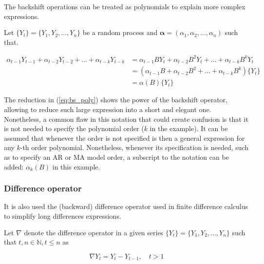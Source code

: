 \begin{property}
	
	The backshift operations can be treated as polynomials to explain more complex expressions.
	
	Let $\{Y_t\} = \{Y_1, Y_2, \ldots, Y_n\}$ be a random process and $\bm{\alpha} = (\alpha_1, \alpha_2, \ldots, \alpha_n)$ such that.

	
	\begin{equation}
		\label{eq:bs_poly}
\begin{split}
		\alpha_{t-1} Y_{t-1} + \alpha_{t-2} Y_{t-2} + \ldots + \alpha_{t-k} Y_{t-k} &=\alpha_{t-1} BY_{t} + \alpha_{t-2} B^2Y_{t} + \ldots + \alpha_{t-k} B^kY_{t} \\
		&=(\alpha_{t-1}B + \alpha_{t-2}B^2 + \ldots + \alpha_{t-k}B^k) \{Y_{t}\}\\
		&=\alpha(B)\{Y_{t}\}
\end{split}
	\end{equation}
	 
The reduction in (\ref{eq:bs_poly}) shows the power of the backshift operator, allowing to reduce such large expression into a short and elegant one. Nonetheless, a common flaw in this notation that could create confusion is that it is not needed to specify the polynomial order ($k$ in the example). It can be assumed that whenever the order is not specified is then a general expression for any $k$-th order polynomial. Nonetheless, whenever its specification is needed, such as to specify an AR or MA model order, a subscript to the notation can be added: $\alpha_k(B)$ in this example.    
	 
\end{property}

\subsubsection*{Difference operator}

It is also used the (backward) difference operator used in finite difference calculus to simplify long differences expressions. 

\begin{definition}
	Let $\nabla$ denote the difference operator in a given series $\{Y_t\} = \{Y_1, Y_2, \ldots, Y_n\}$ such that $ t,n \in \mathbb{N}, t \leq n$ as 
	
	\begin{equation}
		\nabla Y_t = Y_t - Y_{t-1}, \quad t>1
	\end{equation}
\end{definition}

